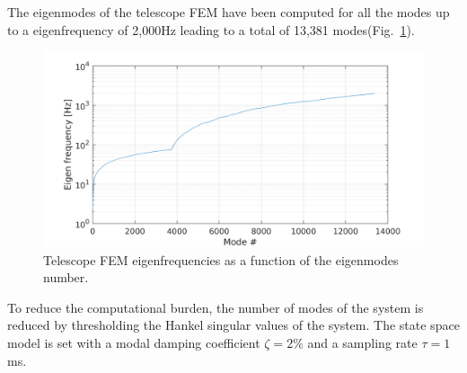 \documentclass{gmto}
\begin{document}
The eigenmodes of the telescope FEM\cite{} have been computed for all the modes
up to a eigenfrequency of 2,000Hz leading to a total of 13,381 modes(Fig.~\ref{fig:fem-eig-val}).
\begin{figure}
  \centering
  \includegraphics[width=0.7\linewidth]{modal_state_space_model_2ndOrder_2000Hz.png}
  \caption{Telescope FEM eigenfrequencies as a function of the eigenmodes
    number.}
  \label{fig:fem-eig-val}
\end{figure}
To reduce the computational burden, the number of modes of the system is reduced by
thresholding the Hankel singular values of the system.
The state space model is set with a modal damping coefficient $\zeta=2$\% and a
sampling rate $\tau=1$ms. 
\end{document}
